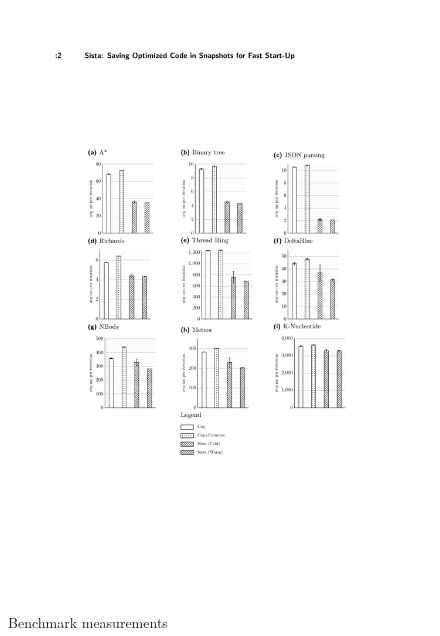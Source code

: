 \documentclass[a4paper,12pt,twoside]{../includes/ThesisStyle}
\begin{document}
\begin{figure}[h!]
    \begin{center}
        \includegraphics[width=\linewidth]{Bench}
        \caption{Benchmark measurements}
        \label{fig:measure}
    \end{center}
\end{figure}
\end{document}
